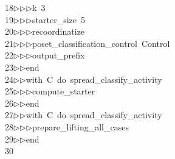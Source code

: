 \begin{tabbing}
18\>$\triangleright$\>$\triangleright$\>$\triangleright$\>k\ 3\ \\[0pt]
19\>$\triangleright$\>$\triangleright$\>$\triangleright$\>starter\_size\ 5\ \\[0pt]
20\>$\triangleright$\>$\triangleright$\>$\triangleright$\>recoordinatize\ \\[0pt]
21\>$\triangleright$\>$\triangleright$\>$\triangleright$\>poset\_classification\_control\ Control\ \\[0pt]
22\>$\triangleright$\>$\triangleright$\>$\triangleright$\>output\_prefix\ \ \\[0pt]
23\>$\triangleright$\>$\triangleright$\>end\ \\[0pt]
24\>$\triangleright$\>$\triangleright$\>with\ C\ do\ spread\_classify\_activity\ \\[0pt]
25\>$\triangleright$\>$\triangleright$\>$\triangleright$\>compute\_starter\ \\[0pt]
26\>$\triangleright$\>$\triangleright$\>end\ \\[0pt]
27\>$\triangleright$\>$\triangleright$\>with\ C\ do\ spread\_classify\_activity\ \\[0pt]
28\>$\triangleright$\>$\triangleright$\>$\triangleright$\>prepare\_lifting\_all\_cases\ \\[0pt]
29\>$\triangleright$\>$\triangleright$\>end\\[0pt]
30\>\end{tabbing}
